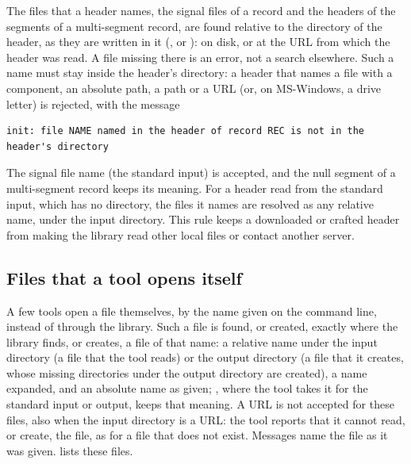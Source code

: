 The files that a header names, the signal files of a record and the headers
of the segments of a multi-segment record, are found relative to the
directory of the header, as they are written in it (, or
): on disk, or at the URL from which the header was read.
A file missing there is an error, not a search elsewhere. Such a name must
stay inside the header's directory: a header that names a file with a
 component, an absolute path, a \code{\textasciitilde} path or a
URL (or, on MS-Windows, a drive letter) is rejected, with the message
\begin{lstlisting}[style=text]
init: file NAME named in the header of record REC is not in the header's directory
\end{lstlisting}
The signal file name \code{-} (the standard input) is accepted, and the null
segment \code{\textasciitilde} of a multi-segment record keeps its meaning.
For a header read from the standard input, which has no directory, the
files it names are resolved as any relative name, under the input
directory. This rule keeps a downloaded or crafted header from making the
library read other local files or contact another server.

\subsection{Files that a tool opens itself}
\label{sec:tool-files}

A few tools open a file themselves, by the name given on the command line,
instead of through the library. Such a file is found, or created, exactly
where the library finds, or creates, a file of that name: a relative name
under the input directory (a file that the tool reads) or the output
directory (a file that it creates, whose missing directories under the
output directory are created), a \code{\textasciitilde} name expanded, and
an absolute name as given; \code{-}, where the tool takes it for the
standard input or output, keeps that meaning. A URL is not accepted for
these files, also when the input directory is a URL: the tool reports that
it cannot read, or create, the file, as for a file that does not exist.
Messages name the file as it was given.  lists these
files.


